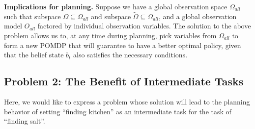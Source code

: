\documentclass{article}
\newcommand{\td}[1]{\tilde{#1}}
\begin{document}
\noindent \textbf{Implications for planning.} Suppose we have a global observation space $\Omega_{all}$ such that subspace $\Omega \subseteq \Omega_{all}$ and subspace $\td{\Omega} \subseteq \Omega_{all}$, and a global observation model $O_{all}$ factored by individual observation variables. The solution to the above problem allows us to, at any time during planning, pick variables from $\Omega_{all}$ to form a new POMDP that will guarantee to have a better optimal policy, given that the belief state $b_t$ also satisfies the necessary conditions.


\subsection{Problem 2: The Benefit of Intermediate Tasks}
Here, we would like to express a problem whose solution will lead to the planning behavior of setting ``finding kitchen'' as an intermediate task for the task of ``finding salt''.
\end{document}
